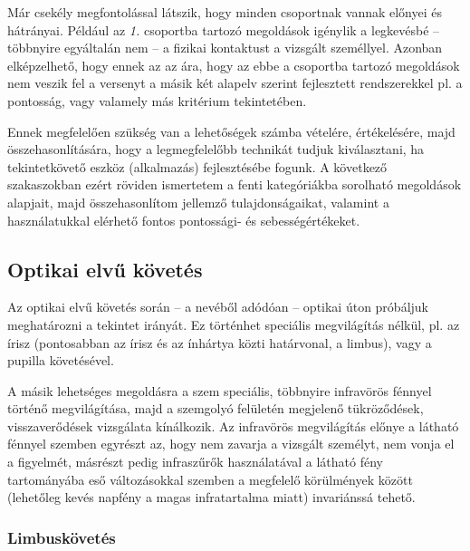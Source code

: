Már csekély megfontolással látszik, hogy minden csoportnak vannak előnyei és hátrányai. Például az \emph{1.} csoportba tartozó megoldások igénylik a legkevésbé -- többnyire egyáltalán nem -- a fizikai kontaktust a vizsgált személlyel. Azonban elképzelhető, hogy ennek az az ára, hogy az ebbe a csoportba tartozó megoldások nem veszik fel a versenyt a másik két alapelv szerint fejlesztett rendszerekkel pl. a pontosság, vagy valamely más kritérium tekintetében.

Ennek megfelelően szükség van a lehetőségek számba vételére, értékelésére, majd összehasonlítására, hogy a legmegfelelőbb technikát tudjuk kiválasztani, ha tekintetkövető eszköz (alkalmazás) fejlesztésébe fogunk. A következő szakaszokban ezért röviden ismertetem a fenti kategóriákba sorolható megoldások alapjait, majd összehasonlítom jellemző tulajdonságaikat, valamint a használatukkal elérhető fontos pontossági- és sebességértékeket.

\subsection{Optikai elvű követés}\label{sect:optikai}

Az optikai elvű követés során -- a nevéből adódóan -- optikai úton próbáljuk meghatározni a tekintet irányát. Ez történhet speciális megvilágítás nélkül, pl. az írisz (pontosabban az írisz és az ínhártya közti határvonal, a limbus), vagy a pupilla követésével.

A másik lehetséges megoldásra a szem speciális, többnyire infravörös fénnyel történő megvilágítása, majd a szemgolyó felületén megjelenő tükröződések, visszaverődések vizsgálata kínálkozik. Az infravörös megvilágítás előnye a látható fénnyel szemben egyrészt az, hogy nem zavarja a vizsgált személyt, nem vonja el a figyelmét, másrészt pedig infraszűrők használatával a látható fény tartományába eső változásokkal szemben a megfelelő körülmények között (lehetőleg kevés napfény a magas infratartalma miatt) invariánssá tehető.

\subsubsection{Limbuskövetés}\label{sect:limbusz}

